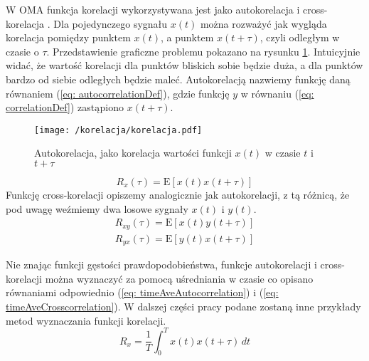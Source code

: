 W OMA funkcja korelacji wykorzystywana jest jako autokorelacja  i cross-korelacja . Dla pojedynczego sygnału $x(t)$ można rozważyć jak wygląda korelacja pomiędzy punktem $x(t)$, a punktem $x(t+\tau)$, czyli odległym w czasie o $\tau$. Przedstawienie graficzne problemu pokazano na rysunku \ref{fig: autocorrelationExample}. Intuicyjnie widać, że wartość korelacji dla punktów bliskich sobie będzie duża, a dla punktów bardzo od siebie odległych będzie maleć. Autokorelacją nazwiemy funkcję daną równaniem (\ref{eq: autocorrelationDef}), gdzie funkcję $y$ w równaniu (\ref{eq: correlationDef}) zastąpiono $x(t+\tau)$. 
\begin{figure}[h] 
	\centering
	\texttt{[image: /korelacja/korelacja.pdf]}
	\captionsetup{justification=centering}
	\caption{Autokorelacja, jako korelacja wartości funkcji $x(t)$ w czasie $t$ i $t+\tau$}
	\label{fig: autocorrelationExample}
\end{figure}
\begin{equation} \label{eq: autocorrelationDef}
	R_x(\tau)=\mathrm{E}[x(t)x(t+\tau)]
\end{equation}
Funkcję cross-korelacji opiszemy analogicznie jak autokorelacji, z tą różnicą, że pod uwagę weźmiemy dwa losowe sygnały $x(t)$ i $y(t)$.
\begin{equation} \label{eq: crosscorrelationDef}
	\begin{aligned}
	R_{xy}(\tau)=\mathrm{E}[x(t)y(t+\tau)]\\	
	R_{yx}(\tau)=\mathrm{E}[y(t)x(t+\tau)]
	\end{aligned}
\end{equation}

Nie znając funkcji gęstości prawdopodobieństwa, funkcje autokorelacji  i cross-korelacji można wyznaczyć za pomocą uśredniania w czasie co opisano równaniami odpowiednio (\ref{eq: timeAveAutocorrelation}) i (\ref{eq: timeAveCrosscorrelation}). W dalszej części pracy podane zostaną inne przykłady metod wyznaczania funkcji korelacji.
\begin{equation} \label{eq: timeAveAutocorrelation}
	R_x = \frac{1}{T}\int_{0}^{T}x(t)x(t+\tau) \,dt
\end{equation}

